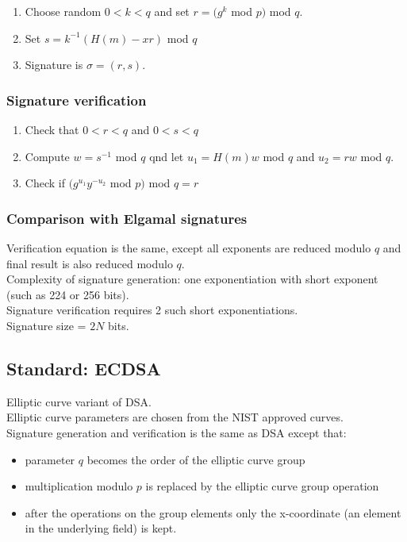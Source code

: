 \documentclass{article}
\begin{document}
\begin{enumerate}
    \item Choose random $0<k<q$ and set $r = (g^k$ mod $p)$ mod $q$.
    \item Set $s = k^{-1} ( H(m) - xr)$ mod $q$
    \item Signature is $\sigma = (r,s)$.
\end{enumerate}

\subsubsection{Signature verification}

\begin{enumerate}
    \item Check that $0<r<q$ and $0<s<q$
    \item Compute $w = s^{-1}$ mod $q$ qnd let $u_1= H(m)w$ mod $q$ and $u_2 = rw$ mod $q$.
    \item Check if $(g^{u_1}y^{-u_2}$ mod $p)$ mod $q = r$
 \end{enumerate}
 
 \subsubsection{Comparison with Elgamal signatures}
 
 Verification equation is the same, except all exponents are reduced modulo $q$ and final result is also reduced modulo $q$.\\
 Complexity of signature generation: one exponentiation with short exponent (such as 224 or 256 bits).\\
 Signature verification requires 2 such short exponentiations.\\
 Signature size = $2N$ bits.
 
 \subsection{Standard: ECDSA}
 
 Elliptic curve variant of DSA.\\
 Elliptic curve parameters are chosen from the NIST approved curves.\\
 Signature generation and verification is the same as DSA except that:
 \begin{itemize}
     \item parameter $q$ becomes the order of the elliptic curve group
     \item multiplication modulo $p$ is replaced by the elliptic curve group operation
     \item after the operations on the group elements only the x-coordinate (an element in the underlying field) is kept.
 \end{itemize}
\end{document}
